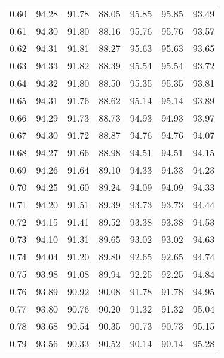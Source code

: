 \begin{tabular}{|c|c|c|c|c|c|c|}
      0.60 &     94.28 &     91.78 &      88.05 &   95.85 &      95.85 &         93.49 \\
      0.61 &     94.30 &     91.80 &      88.16 &   95.76 &      95.76 &         93.57 \\
      0.62 &     94.31 &     91.81 &      88.27 &   95.63 &      95.63 &         93.65 \\
      0.63 &     94.33 &     91.82 &      88.39 &   95.54 &      95.54 &         93.72 \\
      0.64 &     94.32 &     91.80 &      88.50 &   95.35 &      95.35 &         93.81 \\
      0.65 &     94.31 &     91.76 &      88.62 &   95.14 &      95.14 &         93.89 \\
      0.66 &     94.29 &     91.73 &      88.73 &   94.93 &      94.93 &         93.97 \\
      0.67 &     94.30 &     91.72 &      88.87 &   94.76 &      94.76 &         94.07 \\
      0.68 &     94.27 &     91.66 &      88.98 &   94.51 &      94.51 &         94.15 \\
      0.69 &     94.26 &     91.64 &      89.10 &   94.33 &      94.33 &         94.23 \\
      0.70 &     94.25 &     91.60 &      89.24 &   94.09 &      94.09 &         94.33 \\
      0.71 &     94.20 &     91.51 &      89.39 &   93.73 &      93.73 &         94.44 \\
      0.72 &     94.15 &     91.41 &      89.52 &   93.38 &      93.38 &         94.53 \\
      0.73 &     94.10 &     91.31 &      89.65 &   93.02 &      93.02 &         94.63 \\
      0.74 &     94.04 &     91.20 &      89.80 &   92.65 &      92.65 &         94.74 \\
      0.75 &     93.98 &     91.08 &      89.94 &   92.25 &      92.25 &         94.84 \\
      0.76 &     93.89 &     90.92 &      90.08 &   91.78 &      91.78 &         94.95 \\
      0.77 &     93.80 &     90.76 &      90.20 &   91.32 &      91.32 &         95.04 \\
      0.78 &     93.68 &     90.54 &      90.35 &   90.73 &      90.73 &         95.15 \\
      0.79 &     93.56 &     90.33 &      90.52 &   90.14 &      90.14 &         95.28 \\

\end{tabular}
